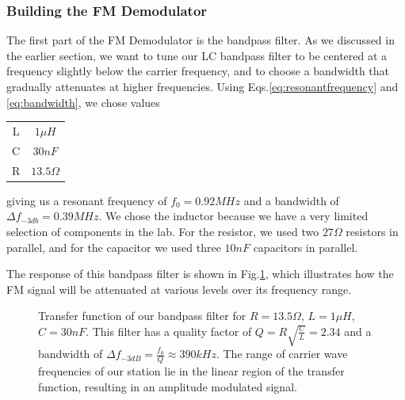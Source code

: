 \documentclass[12pt]{article}
\begin{document}
\subsubsection*{Building the FM Demodulator}
The first part of the FM Demodulator is the bandpass filter. As we discussed in the earlier section, we want to tune our LC bandpass filter to be centered at a frequency slightly below the carrier frequency, and to choose a bandwidth that gradually attenuates at higher frequencies. Using Eqs.\ref{eq:resonantfrequency} and \ref{eq:bandwidth}, we chose values

\begin{center}
  \begin{tabular}{ c  c }
    L & $1\mu H$ \\
    C & $30nF$ \\
    R & $13.5\Omega$ 
  \end{tabular}
\end{center}
giving us a resonant frequency of $f_0 = 0.92 MHz$ and a bandwidth of $\Delta{f}_{-3db} = 0.39 MHz$. We chose the inductor because we have a very limited selection of components in the lab. For the resistor, we used two $27\Omega$ resistors in parallel, and for the capacitor we used three $10nF$ capacitors in parallel.

The response of this bandpass filter is shown in Fig.\ref{fig:bandpasstransfer}, which illustrates how the FM signal will be attenuated at various levels over its frequency range.

\begin{figure}[H]
\caption{Transfer function of our bandpass filter for $R =13.5\Omega$, $L=1\mu H$, $C=30nF$. This filter has a quality factor of $Q=R\sqrt{\frac{C}{L}}=2.34$ and a bandwidth of $\Delta f_{-3dB}=\frac{f_0}{Q}\approx 390kHz$. The range of carrier wave frequencies of our station lie in the linear region of the transfer function, resulting in an amplitude modulated signal.}
\label{fig:bandpasstransfer}
\end{figure}
\end{document}
